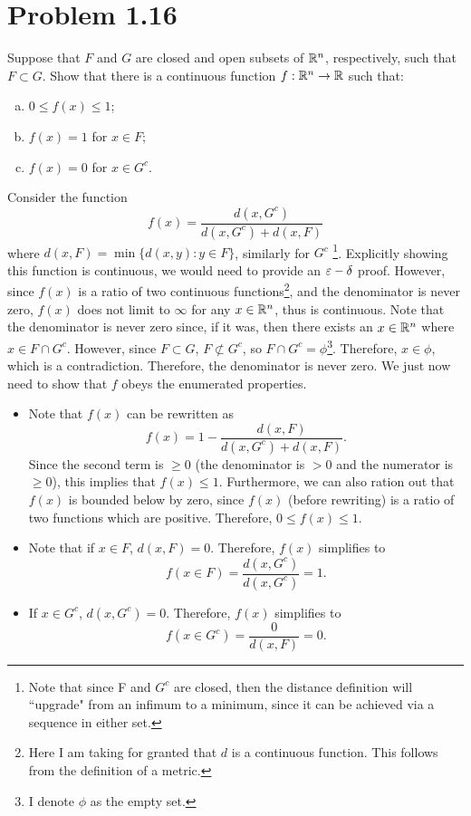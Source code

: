 \newpage
\section{Problem 1.16}
Suppose that $F$ and $G$ are closed and open subsets of $\mathbb{R}^n$, respectively, such that $F \subset G$. Show that there is a continuous function $f: \mathbb{R}^n \rightarrow \mathbb{R}$ such that:
\begin{enumerate}[(a)]
    \item $0 \leq f(x) \leq 1$;
    \item $f(x) = 1$ for $x \in F$;
    \item $f(x) = 0$ for $x \in G^c$.
\end{enumerate}
\partbreak
\begin{solution}

    Consider the function
    \[
    f(x) = \frac{d(x, G^c)}{d(x, G^c) + d(x, F)}
    \]
    where $d(x, F) = \min \{ d(x, y) : y \in F \}$, similarly for $G^c$ \footnote{Note that since F and $G^c$ are closed, then the distance definition will ``upgrade" from an infimum to a minimum, since it can be achieved via a sequence in either set.}. Explicitly showing this function is continuous, we would need to provide an $\varepsilon -\delta$ proof. However, since $f(x)$ is a ratio of two continuous functions\footnote{Here I am taking for granted that $d$ is a continuous function. This follows from the definition of a metric.}, and the denominator is never zero, $f(x)$ does not limit to $\infty$ for any $x \in \mathbb{R}^n$, thus is continuous. Note that the denominator is never zero since, if it was, then there exists an $x \in \mathbb{R}^n$ where $x \in F\cap G^c$. However, since $F \subset G$, $F \not\subset G^c$, so $F\cap G^c = \phi$\footnote{I denote $\phi$ as the empty set.}. Therefore, $x \in \phi$, which is a contradiction. Therefore, the denominator is never zero. We just now need to show that $f$ obeys the enumerated properties.

    \begin{itemize}[(a)]
        \item Note that $f(x)$ can be rewritten as
        \[
        f(x) = 1 - \frac{d(x, F)}{d(x, G^c) + d(x, F)}.
        \]
        Since the second term is $\geq 0$ (the denominator is $>0$ and the numerator is $\geq 0$), this implies that $f(x) \leq 1$. Furthermore, we can also ration out that $f(x)$ is bounded below by zero, since $f(x)$ (before rewriting) is a ratio of two functions which are positive. Therefore, $0 \leq f(x) \leq 1$.
        \item Note that if $x \in F$, $d(x, F) = 0$. Therefore, $f(x)$ simplifies to 
        \[
        f(x \in F) = \frac{d(x, G^c)}{d(x, G^c)} = 1.
        \]
        \item If $x \in G^c$, $d(x, G^c) = 0$. Therefore, $f(x)$ simplifies to 
        \[
        f(x \in G^c) = \frac{0}{d(x, F)} = 0.
        \]
    \end{itemize}
\end{solution}
\newpage

